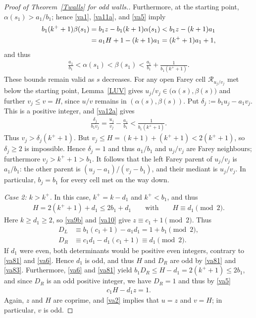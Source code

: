 \documentclass[11pt,reqno,tbtags,a4paper]{amsart}
\numberwithin{equation}{section}
\renewcommand\le{\leq}
\renewcommand\ge{\geq}
\renewcommand\leq{\leqslant}
\renewcommand\geq{\geqslant}
\theoremstyle{plain}%
\theoremstyle{definition}
\theoremstyle{remark}
\newcommand\pfcase[2]{\smallskip\noindent\emph{Case #1: #2} \noindent}
\newcommand{\refT}[1]{Theorem~\ref{#1}}
\newcommand{\refL}[1]{Lemma~\ref{#1}}
\newcommand\bigpar[1]{\bigl(#1\bigr)}
\newcommand\ga{\alpha}
\newcommand\gb{\beta}
\newcommand\cR{{\mathcal R}}
\newcommand\uvx[1]{_{u_{#1}/v_{#1}}}
\newcommand\kx{{k^+}}
\newcommand\0{{\boldsymbol 0}}
\newcommand\1{{\boldsymbol 1}}
\begin{document}
\begin{proof}[Proof of \refT{Twalls} for odd walls.]
%
Furthermore,
at the starting point, $\ga(s_1)>a_1/b_1$; 
hence \eqref{va1}, \eqref{va11a}, and \eqref{va5} imply 
\begin{align}\label{va73a}
  b_1(\kx+1)\gb(s_1)
&=b_1z-b_1(k+1)\ga(s_1)
<b_1z-(k+1)a_1
\notag\\&
=a_1H+1-(k+1)a_1=(\kx+1)a_1+1,
\end{align}
and thus
\begin{align}\label{va12a}
 \frac{a_1}{b_1}<\ga(s_1)<\gb(s_1)
 <\frac{a_1}{b_1}+\frac{1}{b_1(\kx+1)}.
\end{align}
These bounds remain valid as $s$ decreases.
For any open Farey cell $\cR\uvx j$ met below the starting point,
\refL{LUV} gives 
$u_j/v_j\in\bigpar{\ga(s),\gb(s)}$ and further
$v_j\le v=H$, since $u/v$ remains in
$(\ga(s),\gb(s))$.
Put $\delta_j:=b_1u_j-a_1v_j$.
This is a positive integer, and \eqref{va12a} gives
\begin{align}
 \frac{\delta_j}{b_1v_j}
 =\frac{u_j}{v_j}-\frac{a_1}{b_1}
 <\frac{1}{b_1(\kx+1)}.
\end{align}
Thus $v_j>\delta_j(\kx+1)$.
But $v_j\le H=(k+1)+(\kx+1)<2(\kx+1)$, so $\delta_j\ge2$ is impossible.
Hence $\delta_j=1$ and 
thus $a_1/b_1$ and $u_j/v_j$ are Farey neighbours;
furthermore
$v_j>\kx+1>b_1$.
It follows that the left Farey parent of $u_j/v_j$ is $a_1/b_1$:
the other parent is $(u_j-a_1)/(v_j-b_1)$, and their mediant is $u_j/v_j$.
In particular, $b_j=b_1$ for every cell met on the way down.


\pfcase2{$k>\kx$.} 
In this case, $\kx=k-d_1$ and $\kx< b_1$, and thus
\begin{align}\label{va81}
H=2(\kx+1)+d_1\le2b_1+d_1
\qquad\text{with}\qquad 
H\equiv d_1 \pmod2.
\end{align}
Here $k\ge d_1\ge2$, so \eqref{va9b} and \eqref{va10} give
$z\equiv c_1+1\pmod2$. Thus
\begin{align}\label{va82}
 D_L&\equiv b_1(c_1+1) -a_1d_1
= 1+b_1\pmod2,
\\ \label{va83}
D_R&\equiv c_1d_1-d_1(c_1+1)
\equiv d_1\pmod2.
\end{align}
If $d_1$ were even, both determinants would be positive even integers,
contrary to \eqref{va81}
and \eqref{va6}.
Hence $d_1$ is odd, and thus $H$ and $D_R$ are odd by \eqref{va81} and
\eqref{va83}. 
Furthermore, \eqref{va6} and \eqref{va81} yield
$b_1D_R\le H-d_1=2(\kx+1)\le2b_1$,
and since $D_R$ is an odd positive integer, we have $D_R=1$ and thus by
\eqref{va5} 
\begin{align}\label{va11b}
 c_1H-d_1z=1.
\end{align}
Again,
$z$ and $H$ are coprime,  and \eqref{va2} implies that $u=z$ and $v=H$;
in particular, $v$ is odd.



\end{proof}
\end{document}
